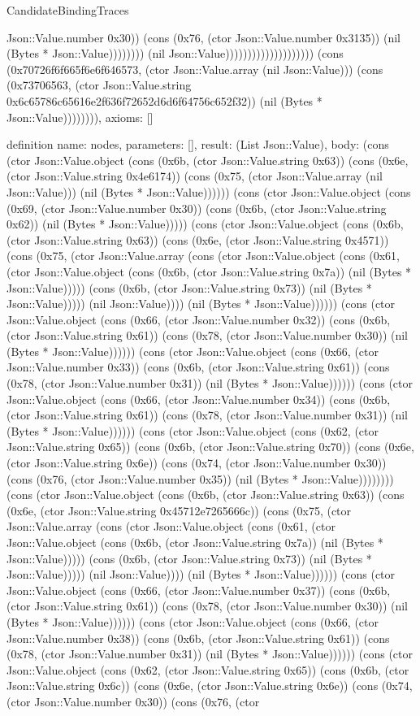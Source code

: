 \begin{lexlean}{CandidateBindingTraces}
\begin{semanticmodule}
{Json::Value.number 0x30)) (cons (0x76, (ctor Json::Value.number 0x3135)) (nil (Bytes * Json::Value)))))))) (nil Json::Value)))))))))))))))))))) (cons (0x70726f6f665f6e6f646573, (ctor Json::Value.array (nil Json::Value))) (cons (0x73706563, (ctor Json::Value.string 0x6c65786c65616e2f636f72652d6d6f64756c652f32)) (nil (Bytes * Json::Value)))))))),
 axioms: []
}

definition{
 name: nodes,
 parameters: [],
 result: (List Json::Value),
 body: (cons (ctor Json::Value.object (cons (0x6b, (ctor Json::Value.string 0x63)) (cons (0x6e, (ctor Json::Value.string 0x4e6174)) (cons (0x75, (ctor Json::Value.array (nil Json::Value))) (nil (Bytes * Json::Value)))))) (cons (ctor Json::Value.object (cons (0x69, (ctor Json::Value.number 0x30)) (cons (0x6b, (ctor Json::Value.string 0x62)) (nil (Bytes * Json::Value))))) (cons (ctor Json::Value.object (cons (0x6b, (ctor Json::Value.string 0x63)) (cons (0x6e, (ctor Json::Value.string 0x4571)) (cons (0x75, (ctor Json::Value.array (cons (ctor Json::Value.object (cons (0x61, (ctor Json::Value.object (cons (0x6b, (ctor Json::Value.string 0x7a)) (nil (Bytes * Json::Value))))) (cons (0x6b, (ctor Json::Value.string 0x73)) (nil (Bytes * Json::Value))))) (nil Json::Value)))) (nil (Bytes * Json::Value)))))) (cons (ctor Json::Value.object (cons (0x66, (ctor Json::Value.number 0x32)) (cons (0x6b, (ctor Json::Value.string 0x61)) (cons (0x78, (ctor Json::Value.number 0x30)) (nil (Bytes * Json::Value)))))) (cons (ctor Json::Value.object (cons (0x66, (ctor Json::Value.number 0x33)) (cons (0x6b, (ctor Json::Value.string 0x61)) (cons (0x78, (ctor Json::Value.number 0x31)) (nil (Bytes * Json::Value)))))) (cons (ctor Json::Value.object (cons (0x66, (ctor Json::Value.number 0x34)) (cons (0x6b, (ctor Json::Value.string 0x61)) (cons (0x78, (ctor Json::Value.number 0x31)) (nil (Bytes * Json::Value)))))) (cons (ctor Json::Value.object (cons (0x62, (ctor Json::Value.string 0x65)) (cons (0x6b, (ctor Json::Value.string 0x70)) (cons (0x6e, (ctor Json::Value.string 0x6e)) (cons (0x74, (ctor Json::Value.number 0x30)) (cons (0x76, (ctor Json::Value.number 0x35)) (nil (Bytes * Json::Value)))))))) (cons (ctor Json::Value.object (cons (0x6b, (ctor Json::Value.string 0x63)) (cons (0x6e, (ctor Json::Value.string 0x45712e7265666c)) (cons (0x75, (ctor Json::Value.array (cons (ctor Json::Value.object (cons (0x61, (ctor Json::Value.object (cons (0x6b, (ctor Json::Value.string 0x7a)) (nil (Bytes * Json::Value))))) (cons (0x6b, (ctor Json::Value.string 0x73)) (nil (Bytes * Json::Value))))) (nil Json::Value)))) (nil (Bytes * Json::Value)))))) (cons (ctor Json::Value.object (cons (0x66, (ctor Json::Value.number 0x37)) (cons (0x6b, (ctor Json::Value.string 0x61)) (cons (0x78, (ctor Json::Value.number 0x30)) (nil (Bytes * Json::Value)))))) (cons (ctor Json::Value.object (cons (0x66, (ctor Json::Value.number 0x38)) (cons (0x6b, (ctor Json::Value.string 0x61)) (cons (0x78, (ctor Json::Value.number 0x31)) (nil (Bytes * Json::Value)))))) (cons (ctor Json::Value.object (cons (0x62, (ctor Json::Value.string 0x65)) (cons (0x6b, (ctor Json::Value.string 0x6c)) (cons (0x6e, (ctor Json::Value.string 0x6e)) (cons (0x74, (ctor Json::Value.number 0x30)) (cons (0x76, (ctor }
\end{semanticmodule}
\end{lexlean}

